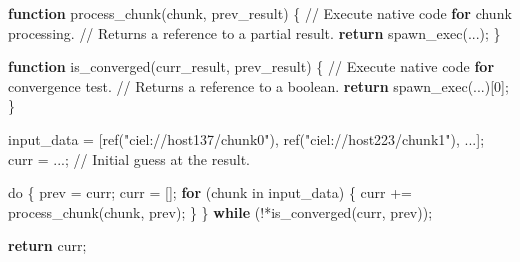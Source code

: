 \documentclass[
]{article}
\newenvironment{Shaded}{}{}
\newcommand{\BaseNTok}[1]{\textcolor[rgb]{0.25,0.63,0.44}{#1}}
\newcommand{\FloatTok}[1]{\textcolor[rgb]{0.25,0.63,0.44}{#1}}
\newcommand{\KeywordTok}[1]{\textcolor[rgb]{0.00,0.44,0.13}{\textbf{#1}}}
\newcommand{\NormalTok}[1]{#1}
\newcommand{\OperatorTok}[1]{\textcolor[rgb]{0.40,0.40,0.40}{#1}}
\newcommand{\StringTok}[1]{\textcolor[rgb]{0.25,0.44,0.63}{#1}}
\newcommand{\VariableTok}[1]{\textcolor[rgb]{0.10,0.09,0.49}{#1}}
\begin{document}
\begin{Shaded}
\begin{Highlighting}[]
\KeywordTok{function} \VariableTok{process\_chunk}\NormalTok{(}\VariableTok{chunk}\OperatorTok{,} \VariableTok{prev\_result}\NormalTok{) \{}
    \OperatorTok{//} \VariableTok{Execute} \VariableTok{native} \VariableTok{code} \KeywordTok{for} \VariableTok{chunk} \VariableTok{processing}\NormalTok{.}
    \OperatorTok{//} \VariableTok{Returns} \VariableTok{a} \VariableTok{reference} \VariableTok{to} \VariableTok{a} \VariableTok{partial} \VariableTok{result}\NormalTok{.}
    \KeywordTok{return} \VariableTok{spawn\_exec}\NormalTok{(}\OperatorTok{...}\NormalTok{)}\OperatorTok{;}
\NormalTok{\}}

\KeywordTok{function} \VariableTok{is\_converged}\NormalTok{(}\VariableTok{curr\_result}\OperatorTok{,} \VariableTok{prev\_result}\NormalTok{) \{}
    \OperatorTok{//} \VariableTok{Execute} \VariableTok{native} \VariableTok{code} \KeywordTok{for} \VariableTok{convergence} \VariableTok{test}\NormalTok{.}
    \OperatorTok{//} \VariableTok{Returns} \VariableTok{a} \VariableTok{reference} \VariableTok{to} \VariableTok{a} \VariableTok{boolean}\NormalTok{.}
    \KeywordTok{return} \VariableTok{spawn\_exec}\NormalTok{(}\OperatorTok{...}\NormalTok{)[}\FloatTok{0}\NormalTok{]}\OperatorTok{;}
\NormalTok{\}}

\VariableTok{input\_data} \OperatorTok{=}\NormalTok{ [}\VariableTok{ref}\NormalTok{(}\StringTok{"ciel://host137/chunk0"}\NormalTok{)}\OperatorTok{,}
    \VariableTok{ref}\NormalTok{(}\StringTok{"ciel://host223/chunk1"}\NormalTok{)}\OperatorTok{,}
    \OperatorTok{...}\NormalTok{]}\OperatorTok{;}
\VariableTok{curr} \OperatorTok{=} \OperatorTok{...;} \OperatorTok{//} \VariableTok{Initial} \VariableTok{guess} \VariableTok{at} \VariableTok{the} \VariableTok{result}\NormalTok{.}

\VariableTok{do}\NormalTok{ \{}
    \VariableTok{prev} \OperatorTok{=} \VariableTok{curr}\OperatorTok{;}
    \VariableTok{curr} \OperatorTok{=}\NormalTok{ []}\OperatorTok{;}
    \KeywordTok{for}\NormalTok{ (}\VariableTok{chunk} \VariableTok{in} \VariableTok{input\_data}\NormalTok{) \{}
    \VariableTok{curr} \OperatorTok{+=} \VariableTok{process\_chunk}\NormalTok{(}\VariableTok{chunk}\OperatorTok{,} \VariableTok{prev}\NormalTok{)}\OperatorTok{;}
\NormalTok{    \}}
\NormalTok{\} }\KeywordTok{while}\NormalTok{ (}\BaseNTok{!*is\_converged(curr, prev));}

\KeywordTok{return} \VariableTok{curr}\OperatorTok{;} 
\end{Highlighting}
\end{Shaded}
\end{document}
